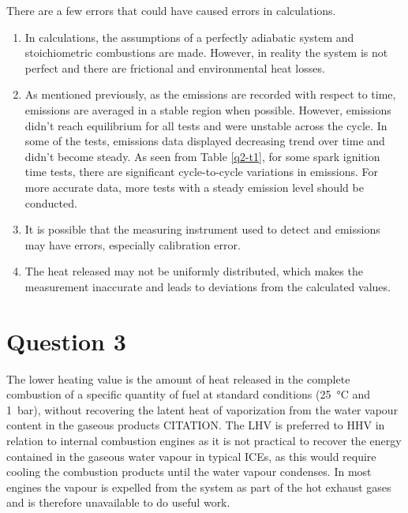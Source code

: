\documentclass[11pt]{article}
\begin{document}
There are a few errors that could have caused errors in calculations.
\begin{enumerate}
    \item In calculations, the assumptions of a perfectly adiabatic system and stoichiometric combustions are made. However, in reality the system is not perfect and there are frictional and environmental heat losses. 
    \item As mentioned previously, as the emissions are recorded with respect to time, emissions are averaged in a stable region when possible. However, emissions didn’t reach equilibrium for all tests and were unstable across the cycle. In some of the tests, emissions data displayed decreasing trend over time and didn’t become steady. As seen from Table \ref{q2-t1}, for some spark ignition time tests, there are significant cycle-to-cycle variations in emissions. For more accurate data, more tests with a steady emission level should be conducted. 
    \item It is possible that the measuring instrument used to detect  and  emissions may have errors, especially calibration error.
    \item The heat released may not be uniformly distributed, which makes the measurement inaccurate and leads to deviations from the calculated values. 
\end{enumerate}
\section*{Question 3}
The lower heating value is the amount of heat released in the complete combustion of a specific quantity of fuel at standard conditions (\SI{25}{\celsius} and \SI{1}{\bar}), without recovering the latent heat of vaporization from the water vapour content in the gaseous products CITATION. The LHV is preferred to HHV in relation to internal combustion engines as it is not practical to recover the energy contained in the gaseous water vapour in typical ICEs, as this would require cooling the combustion products until the water vapour condenses. In most engines the vapour is expelled from the system as part of the hot exhaust gases and is therefore unavailable to do useful work. 
\end{document}
